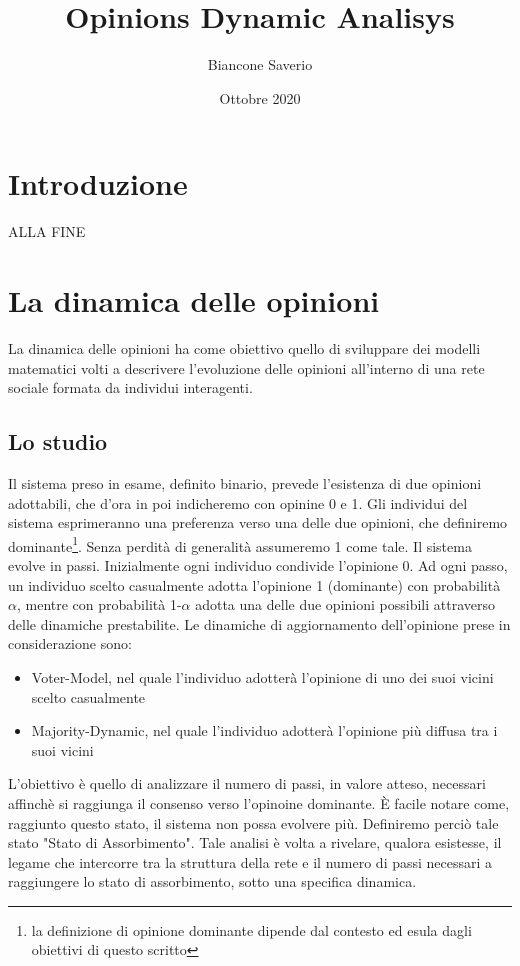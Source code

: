 \documentclass{article}
\title{Opinions Dynamic Analisys}
\author{Biancone Saverio}
\date{Ottobre 2020}
\begin{document}
\maketitle

\section{Introduzione}
ALLA FINE
\section{La dinamica delle opinioni}
La dinamica delle opinioni ha come obiettivo quello di sviluppare dei modelli matematici volti a descrivere l'evoluzione delle opinioni all'interno di una rete sociale formata da individui interagenti.
\newline
\newline
\subsection{Lo studio}
Il sistema preso in esame, definito binario, prevede l'esistenza di due opinioni adottabili, che d'ora in poi indicheremo con opinine 0 e 1. Gli individui del sistema esprimeranno una preferenza verso una delle due opinioni, che definiremo  dominante\footnote{la definizione di opinione dominante dipende dal contesto ed esula dagli obiettivi di questo scritto}.
\newline
Senza perdità di generalità assumeremo 1 come tale.
\newline
\newline
Il sistema evolve in passi. Inizialmente ogni individuo condivide l'opinione 0.
\newline
Ad ogni passo, un individuo scelto casualmente adotta l'opinione 1 (dominante) con probabilità $\alpha$, mentre con probabilità 1-$\alpha$ adotta una delle due opinioni possibili attraverso delle dinamiche prestabilite.
\newline
\newline
Le dinamiche di aggiornamento dell'opinione prese in considerazione sono:
\begin{itemize}
\item Voter-Model, nel quale l'individuo adotterà l'opinione di uno dei suoi vicini scelto casualmente
\item Majority-Dynamic, nel quale l'individuo adotterà l'opinione più diffusa tra i suoi vicini
\end{itemize}
\newline
L'obiettivo è quello di analizzare il numero di passi, in valore atteso, necessari affinchè si raggiunga il consenso verso l'opinoine dominante. È facile notare come, raggiunto questo stato, il sistema non possa evolvere più. Definiremo perciò tale stato "Stato di Assorbimento". 
\newline
\newline
Tale analisi è volta a rivelare, qualora esistesse, il legame che intercorre tra la struttura della rete e il numero di passi necessari a raggiungere lo stato di assorbimento, sotto una specifica dinamica.
\end{document}
